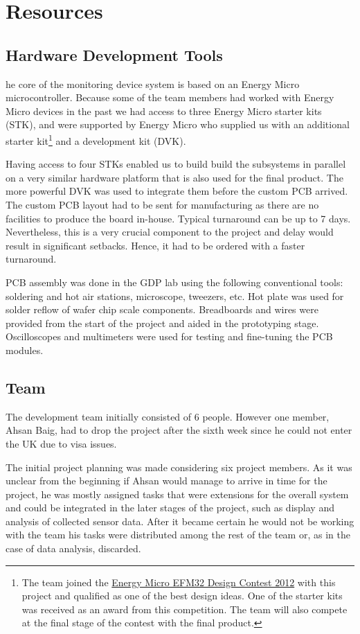 \section{Resources}
\subsection{Hardware Development Tools}
he core of the monitoring device system is based on an Energy Micro microcontroller. Because some of the team members had worked with Energy Micro devices in the past we had access to three Energy Micro starter kits (STK), and were supported by Energy Micro who supplied us with an additional starter kit\footnote{The team joined the \href{ http://forum.energymicro.com/forum/49-efm32-design-contest-2012/}{Energy Micro EFM32 Design Contest 2012}  with this project and qualified as one of the best design ideas. One of the starter kits was received as an award from this competition. The team will also compete at the final stage of the contest with the final product.}
and a development kit (DVK). 

Having access to four STKs enabled us to build build the subsystems in parallel on a very similar hardware platform that is also used for the final product. The more powerful DVK was used to integrate them before the custom PCB arrived. The custom PCB layout had to be sent for manufacturing as there are no facilities to produce the board in-house. Typical turnaround can be up to 7 days. Nevertheless, this is a very crucial component to the project and delay would result in significant setbacks. Hence, it had to be ordered with a faster turnaround.

PCB assembly was done in the GDP lab using the following conventional tools: soldering and hot air stations, microscope, tweezers, etc. Hot plate was used for solder reflow of wafer chip scale components. Breadboards and wires were provided from the start of the project and aided in the prototyping stage. Oscilloscopes and multimeters were used for testing and fine-tuning the PCB modules.


\subsection{Team}
The development team initially consisted of 6 people. However one member, Ahsan Baig, had to drop the project after the sixth week since he could not enter the UK due to visa issues.

The initial project planning was made considering six project members. As it was unclear from the beginning if Ahsan would manage to arrive in time for the project, he was mostly assigned tasks that were extensions for the overall system and could be integrated in the later stages of the project, such as display and analysis of collected sensor data. After it became certain he would not be working with the team his tasks were distributed among the rest of the team or, as in the case of data analysis, discarded. 


